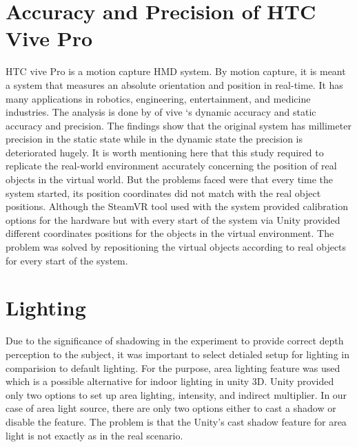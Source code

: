 \section{Accuracy and Precision of HTC Vive Pro}
HTC vive Pro is a motion capture HMD system. By motion capture, it is meant a system that measures an absolute orientation and position in real-time. It has many applications in robotics, engineering, entertainment, and medicine industries. The analysis is done by \cite{niehorster2017accuracy}\cite{borges2018htc} of vive ‘s dynamic accuracy and static accuracy and precision. The findings show that the original system has millimeter precision in the static state while in the dynamic state the precision is deteriorated hugely. It is worth mentioning here that this study required to replicate the real-world environment accurately concerning the position of real objects in the virtual world. But the problems faced were that every time the system started, its position coordinates did not match with the real object positions. Although the SteamVR tool used with the system provided calibration options for the hardware but with every start of the system via Unity provided different coordinates positions for the objects in the virtual environment. The problem was solved by repositioning the virtual objects according to real objects for every start of the system.    
\section{Lighting}
Due to the significance of shadowing in the experiment to provide correct depth perception to the subject, it was important to select detialed setup for lighting in comparision to default lighting. For the purpose, area lighting feature was used which is a possible alternative for indoor lighting in unity 3D. Unity provided only two options to set up area lighting, intensity, and indirect multiplier. In our case of area light source, there are only two options either to cast a shadow or disable the feature. The problem is that the Unity's cast shadow feature for area light is not exactly as in the real scenario. 
